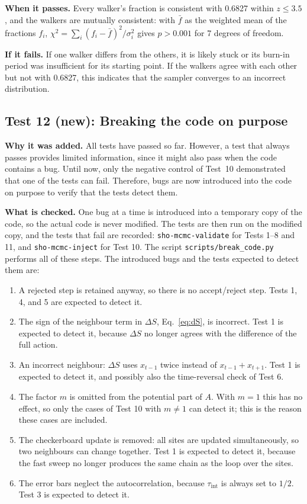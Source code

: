 \documentclass[11pt]{article}
\begin{document}
\textbf{When it passes.} Every walker's fraction is consistent with 0.6827 within $z \le 3.5$, and the walkers are mutually consistent: with $\bar f$ as the weighted mean of the fractions $f_i$, $\chi^2 = \sum_i (f_i - \bar f)^2/\sigma_i^2$ gives $p > 0.001$ for 7 degrees of freedom.

\textbf{If it fails.} If one walker differs from the others, it is likely stuck or its burn-in period was insufficient for its starting point. If the walkers agree with each other but not with 0.6827, this indicates that the sampler converges to an incorrect distribution.

\subsection*{Test 12 (new): Breaking the code on purpose}
\textbf{Why it was added.} All tests have passed so far. However, a test that always passes provides limited information, since it might also pass when the code contains a bug. Until now, only the negative control of Test~10 demonstrated that one of the tests can fail. Therefore, bugs are now introduced into the code on purpose to verify that the tests detect them.

\textbf{What is checked.} One bug at a time is introduced into a temporary copy of the code, so the actual code is never modified. The tests are then run on the modified copy, and the tests that fail are recorded: \texttt{sho-mcmc-validate} for Tests 1--8 and 11, and \texttt{sho-mcmc-inject} for Test 10. The script \texttt{scripts/break\_code.py} performs all of these steps. The introduced bugs and the tests expected to detect them are:
\begin{enumerate}
  \item A rejected step is retained anyway, so there is no accept/reject step. Tests 1, 4, and 5 are expected to detect it.
  \item The sign of the neighbour term in $\Delta S$, Eq.~\eqref{eq:dS}, is incorrect. Test 1 is expected to detect it, because $\Delta S$ no longer agrees with the difference of the full action.
  \item An incorrect neighbour: $\Delta S$ uses $x_{t-1}$ twice instead of $x_{t-1} + x_{t+1}$. Test 1 is expected to detect it, and possibly also the time-reversal check of Test 6.
  \item The factor $m$ is omitted from the potential part of $A$. With $m = 1$ this has no effect, so only the cases of Test 10 with $m \ne 1$ can detect it; this is the reason these cases are included.
  \item The checkerboard update is removed: all sites are updated simultaneously, so two neighbours can change together. Test 1 is expected to detect it, because the fast sweep no longer produces the same chain as the loop over the sites.
  \item The error bars neglect the autocorrelation, because $\tau_{\text{int}}$ is always set to $1/2$. Test 3 is expected to detect it.
\end{enumerate}
\end{document}
